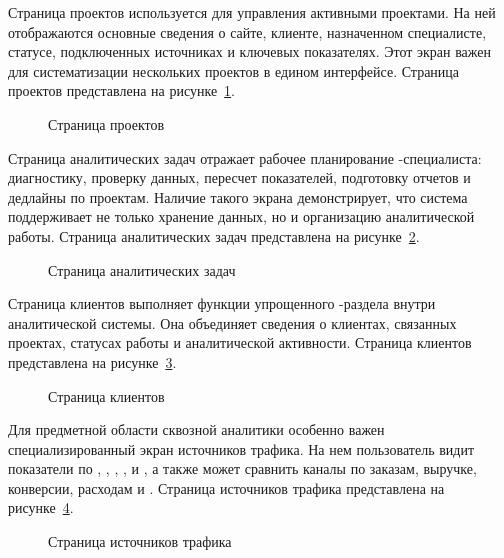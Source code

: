 Страница проектов используется для управления активными  проектами. На ней отображаются основные сведения о сайте, клиенте, назначенном специалисте, статусе, подключенных источниках и ключевых показателях. Этот экран важен для систематизации нескольких проектов в едином интерфейсе. Страница проектов  представлена на рисунке~\ref{fig:ecommerce-projects}.

\begin{figure}[H]
    \centering
    \caption{Страница проектов }
    \label{fig:ecommerce-projects}
\end{figure}

Страница аналитических задач отражает рабочее планирование -специалиста: диагностику, проверку данных, пересчет показателей, подготовку отчетов и дедлайны по проектам. Наличие такого экрана демонстрирует, что система поддерживает не только хранение данных, но и организацию аналитической работы. Страница аналитических задач представлена на рисунке~\ref{fig:analytics-tasks}.

\begin{figure}[H]
    \centering
    \caption{Страница аналитических задач}
    \label{fig:analytics-tasks}
\end{figure}

Страница клиентов выполняет функции упрощенного -раздела внутри аналитической системы. Она объединяет сведения о клиентах, связанных проектах, статусах работы и аналитической активности. Страница клиентов представлена на рисунке~\ref{fig:clients-page}.

\begin{figure}[H]
    \centering
    \caption{Страница клиентов}
    \label{fig:clients-page}
\end{figure}

Для предметной области сквозной аналитики особенно важен специализированный экран источников трафика. На нем пользователь видит показатели по , , , ,  и , а также может сравнить каналы по заказам, выручке, конверсии, расходам и . Страница источников трафика представлена на рисунке~\ref{fig:traffic-sources-page}.

\begin{figure}[H]
    \centering
    \caption{Страница источников трафика}
    \label{fig:traffic-sources-page}
\end{figure}

